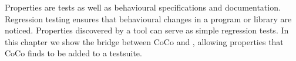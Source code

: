 \chapstart Properties are tests as well as behavioural specifications and documentation.
Regression testing ensures that behavioural changes in a program or library are noticed.  Properties
discovered by a tool can serve as simple regression tests.  In this chapter we show the bridge
between CoCo and \dejafu{}, allowing properties that CoCo finds to be added to a \dejafu{}
testsuite.
